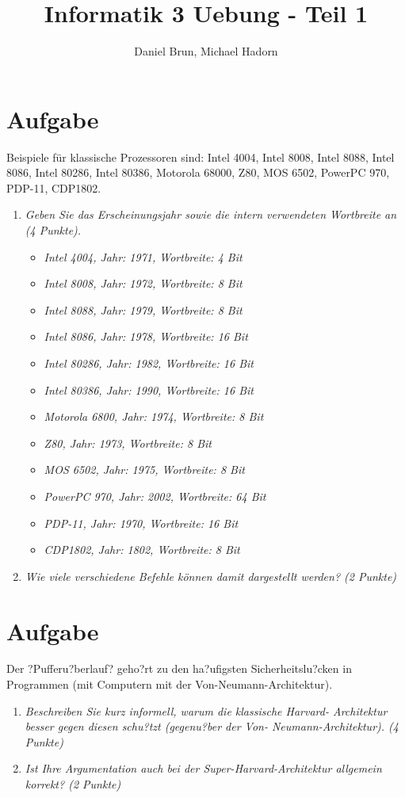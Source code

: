 \documentclass[10pt]{article}
\title{Informatik 3 Uebung - Teil 1\vspace{-2ex}}
\author{Daniel Brun, Michael Hadorn\vspace{-2ex}}
\begin{document}
\maketitle


\section{Aufgabe}
Beispiele für klassische Prozessoren sind: Intel 4004, Intel 8008, Intel 8088, Intel 8086, Intel 80286, Intel 80386, Motorola 68000, Z80, MOS 6502, PowerPC 970, PDP-11, CDP1802.

\begin{enumerate}[label=\alph*)]
	\item 
	\textit{Geben Sie das Erscheinungsjahr sowie die intern verwendeten Wortbreite an (4 Punkte).}
	\begin{itemize}
		\item
		\textit{Intel 4004, Jahr: 1971, Wortbreite: 4 Bit}
		\item
		\textit{Intel 8008, Jahr: 1972, Wortbreite: 8 Bit}
		\item
		\textit{Intel 8088, Jahr: 1979, Wortbreite: 8 Bit}
		\item
		\textit{Intel 8086, Jahr: 1978, Wortbreite: 16 Bit}
		\item
		\textit{Intel 80286, Jahr: 1982, Wortbreite: 16 Bit}
		\item
		\textit{Intel 80386, Jahr: 1990, Wortbreite: 16 Bit}
		\item
		\textit{Motorola 6800, Jahr: 1974, Wortbreite: 8 Bit}
		\item
		\textit{Z80, Jahr: 1973, Wortbreite: 8 Bit}
		\item
		\textit{MOS 6502, Jahr: 1975, Wortbreite: 8 Bit}
		\item
		\textit{PowerPC 970, Jahr: 2002, Wortbreite: 64 Bit}
		\item
		\textit{PDP-11, Jahr: 1970, Wortbreite: 16 Bit}
		\item
		\textit{CDP1802, Jahr: 1802, Wortbreite: 8 Bit}
	\end{itemize}
	\item
	\textit{Wie viele verschiedene Befehle können damit dargestellt werden? (2 Punkte)}
\end{enumerate}


\section{Aufgabe}
Der ?Pufferu?berlauf? geho?rt zu den ha?ufigsten Sicherheitslu?cken in Programmen (mit Computern mit der Von-Neumann-Architektur).
\begin{enumerate}[label=\alph*)]
	\item 
	\textit{Beschreiben Sie kurz informell, warum die klassische Harvard- Architektur besser gegen diesen schu?tzt (gegenu?ber der Von- Neumann-Architektur). (4 Punkte)}
	
	\item
	\textit{Ist Ihre Argumentation auch bei der Super-Harvard-Architektur allgemein korrekt? (2 Punkte)}
\end{enumerate}
\end{document}
